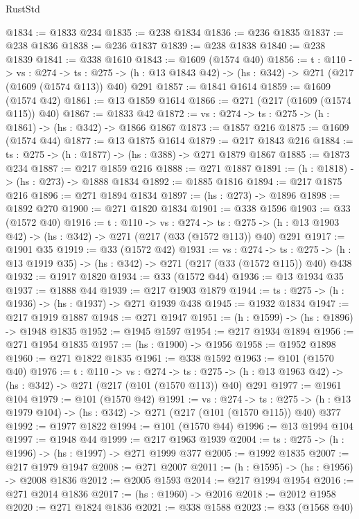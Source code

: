 \begin{lexlean}{RustStd}
\begin{coremodule}
@1834 := @1833 @234
@1835 := @238 @1834
@1836 := @236 @1835
@1837 := @238 @1836
@1838 := @236 @1837
@1839 := @238 @1838
@1840 := @238 @1839
@1841 := @338 @1610
@1843 := @1609 (@1574 @40)
@1856 := {t : @110} ->
  {vs : @274} ->
  {ts : @275} -> (h : @13 @1843 @42) -> (hs : @342) -> @271 (@217 (@1609 (@1574 @113)) @40) @291
@1857 := @1841 @1614
@1859 := @1609 (@1574 @42)
@1861 := @13 @1859 @1614
@1866 := @271 (@217 (@1609 (@1574 @115)) @40)
@1867 := @1833 @42
@1872 := {vs : @274} -> {ts : @275} -> (h : @1861) -> (hs : @342) -> @1866 @1867
@1873 := @1857 @216
@1875 := @1609 (@1574 @44)
@1877 := @13 @1875 @1614
@1879 := @217 @1843 @216
@1884 := {ts : @275} -> (h : @1877) -> (hs : @388) -> @271 @1879 @1867
@1885 := @1873 @234
@1887 := @217 @1859 @216
@1888 := @271 @1887
@1891 := (h : @1818) -> (hs : @273) -> @1888 @1834
@1892 := @1885 @1816
@1894 := @217 @1875 @216
@1896 := @271 @1894 @1834
@1897 := (hs : @273) -> @1896
@1898 := @1892 @270
@1900 := @271 @1820 @1834
@1901 := @338 @1596
@1903 := @33 (@1572 @40)
@1916 := {t : @110} ->
  {vs : @274} ->
  {ts : @275} -> (h : @13 @1903 @42) -> (hs : @342) -> @271 (@217 (@33 (@1572 @113)) @40) @291
@1917 := @1901 @35
@1919 := @33 (@1572 @42)
@1931 := {vs : @274} ->
  {ts : @275} -> (h : @13 @1919 @35) -> (hs : @342) -> @271 (@217 (@33 (@1572 @115)) @40) @438
@1932 := @1917 @1820
@1934 := @33 (@1572 @44)
@1936 := @13 @1934 @35
@1937 := @1888 @44
@1939 := @217 @1903 @1879
@1944 := {ts : @275} -> (h : @1936) -> (hs : @1937) -> @271 @1939 @438
@1945 := @1932 @1834
@1947 := @217 @1919 @1887
@1948 := @271 @1947
@1951 := (h : @1599) -> (hs : @1896) -> @1948 @1835
@1952 := @1945 @1597
@1954 := @217 @1934 @1894
@1956 := @271 @1954 @1835
@1957 := (hs : @1900) -> @1956
@1958 := @1952 @1898
@1960 := @271 @1822 @1835
@1961 := @338 @1592
@1963 := @101 (@1570 @40)
@1976 := {t : @110} ->
  {vs : @274} ->
  {ts : @275} -> (h : @13 @1963 @42) -> (hs : @342) -> @271 (@217 (@101 (@1570 @113)) @40) @291
@1977 := @1961 @104
@1979 := @101 (@1570 @42)
@1991 := {vs : @274} ->
  {ts : @275} -> (h : @13 @1979 @104) -> (hs : @342) -> @271 (@217 (@101 (@1570 @115)) @40) @377
@1992 := @1977 @1822
@1994 := @101 (@1570 @44)
@1996 := @13 @1994 @104
@1997 := @1948 @44
@1999 := @217 @1963 @1939
@2004 := {ts : @275} -> (h : @1996) -> (hs : @1997) -> @271 @1999 @377
@2005 := @1992 @1835
@2007 := @217 @1979 @1947
@2008 := @271 @2007
@2011 := (h : @1595) -> (hs : @1956) -> @2008 @1836
@2012 := @2005 @1593
@2014 := @217 @1994 @1954
@2016 := @271 @2014 @1836
@2017 := (hs : @1960) -> @2016
@2018 := @2012 @1958
@2020 := @271 @1824 @1836
@2021 := @338 @1588
@2023 := @33 (@1568 @40)

\end{coremodule}
\end{lexlean}
